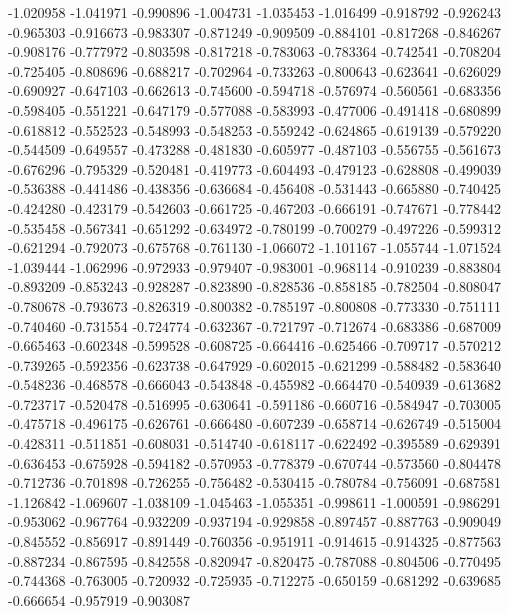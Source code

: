 -1.020958
-1.041971
-0.990896
-1.004731
-1.035453
-1.016499
-0.918792
-0.926243
-0.965303
-0.916673
-0.983307
-0.871249
-0.909509
-0.884101
-0.817268
-0.846267
-0.908176
-0.777972
-0.803598
-0.817218
-0.783063
-0.783364
-0.742541
-0.708204
-0.725405
-0.808696
-0.688217
-0.702964
-0.733263
-0.800643
-0.623641
-0.626029
-0.690927
-0.647103
-0.662613
-0.745600
-0.594718
-0.576974
-0.560561
-0.683356
-0.598405
-0.551221
-0.647179
-0.577088
-0.583993
-0.477006
-0.491418
-0.680899
-0.618812
-0.552523
-0.548993
-0.548253
-0.559242
-0.624865
-0.619139
-0.579220
-0.544509
-0.649557
-0.473288
-0.481830
-0.605977
-0.487103
-0.556755
-0.561673
-0.676296
-0.795329
-0.520481
-0.419773
-0.604493
-0.479123
-0.628808
-0.499039
-0.536388
-0.441486
-0.438356
-0.636684
-0.456408
-0.531443
-0.665880
-0.740425
-0.424280
-0.423179
-0.542603
-0.661725
-0.467203
-0.666191
-0.747671
-0.778442
-0.535458
-0.567341
-0.651292
-0.634972
-0.780199
-0.700279
-0.497226
-0.599312
-0.621294
-0.792073
-0.675768
-0.761130
-1.066072
-1.101167
-1.055744
-1.071524
-1.039444
-1.062996
-0.972933
-0.979407
-0.983001
-0.968114
-0.910239
-0.883804
-0.893209
-0.853243
-0.928287
-0.823890
-0.828536
-0.858185
-0.782504
-0.808047
-0.780678
-0.793673
-0.826319
-0.800382
-0.785197
-0.800808
-0.773330
-0.751111
-0.740460
-0.731554
-0.724774
-0.632367
-0.721797
-0.712674
-0.683386
-0.687009
-0.665463
-0.602348
-0.599528
-0.608725
-0.664416
-0.625466
-0.709717
-0.570212
-0.739265
-0.592356
-0.623738
-0.647929
-0.602015
-0.621299
-0.588482
-0.583640
-0.548236
-0.468578
-0.666043
-0.543848
-0.455982
-0.664470
-0.540939
-0.613682
-0.723717
-0.520478
-0.516995
-0.630641
-0.591186
-0.660716
-0.584947
-0.703005
-0.475718
-0.496175
-0.626761
-0.666480
-0.607239
-0.658714
-0.626749
-0.515004
-0.428311
-0.511851
-0.608031
-0.514740
-0.618117
-0.622492
-0.395589
-0.629391
-0.636453
-0.675928
-0.594182
-0.570953
-0.778379
-0.670744
-0.573560
-0.804478
-0.712736
-0.701898
-0.726255
-0.756482
-0.530415
-0.780784
-0.756091
-0.687581
-1.126842
-1.069607
-1.038109
-1.045463
-1.055351
-0.998611
-1.000591
-0.986291
-0.953062
-0.967764
-0.932209
-0.937194
-0.929858
-0.897457
-0.887763
-0.909049
-0.845552
-0.856917
-0.891449
-0.760356
-0.951911
-0.914615
-0.914325
-0.877563
-0.887234
-0.867595
-0.842558
-0.820947
-0.820475
-0.787088
-0.804506
-0.770495
-0.744368
-0.763005
-0.720932
-0.725935
-0.712275
-0.650159
-0.681292
-0.639685
-0.666654
-0.957919
-0.903087
